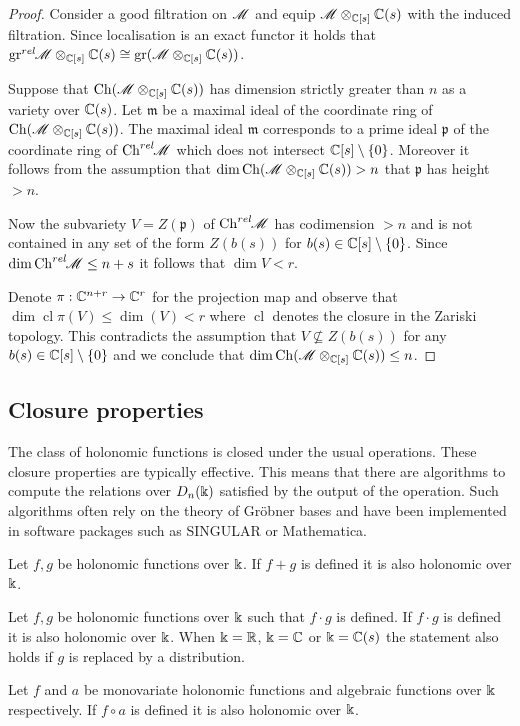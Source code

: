   \begin{proof}
    Consider a good filtration on $\mathscr{M}$ and equip $\mathscr{M}\otimes_{\mathbb{C}[s]}\mathbb{C}(s)$ with the induced filtration.
    Since localisation is an exact functor it holds that $\operatorname{gr}^{rel}\mkern-5mu\mathscr{M}\otimes_{\mathbb{C}[s]}\mathbb{C}(s) \cong \operatorname{gr}(\mathscr{M}\otimes_{\mathbb{C}[s]}\mathbb{C}(s)) $.

    Suppose that $\operatorname{Ch}(\mathscr{M}\otimes_{\mathbb{C}[s]}\mathbb{C}(s))$ has dimension strictly greater than $n$ as a variety over $\mathbb{C}(s)$.
    Let $\mathfrak{m}$ be a maximal ideal of the coordinate ring of $\operatorname{Ch} (\mathscr{M}\otimes_{\mathbb{C}[s]}\mathbb{C}(s))$.
    The maximal ideal $\mathfrak{m}$ corresponds to a prime ideal $\mathfrak{p}$ of the coordinate ring of $\operatorname{Ch}^{rel}\mkern-5mu\mathscr{M}$ which does not intersect $\mathbb{C}[s]\setminus\{0\}$.
    Moreover it follows from the assumption that  $\dim\operatorname{Ch}(\mathscr{M}\otimes_{\mathbb{C}[s]}\mathbb{C}(s))> n$ that $\mathfrak{p}$ has height $>n$.

    Now the subvariety $V = Z(\mathfrak{p})$ of $\operatorname{Ch}^{rel}\mkern-5mu\mathscr{M}$ has codimension $>n$ and is not contained in any set of the form $Z(b(s))$ for $b(s)\in \mathbb{C}[s]\setminus\{0\}$.
    Since $\dim\operatorname{Ch}^{rel}\mkern-5mu\mathscr{M}\leq n+s$ it follows that $\dim V <r$.

    Denote $\pi:\mathbb{C}^{n+r}\to\mathbb{C}^r $ for the projection map and observe that $\dim\operatorname{cl}\pi(V)\leq \dim(V) < r$ where $\operatorname{cl}$ denotes the closure in the Zariski topology. %
    This contradicts the assumption that $V\nsubseteq Z(b(s))$ for any $b(s)\in \mathbb{C}[s]\setminus\{0\}$ and we conclude that $\dim \operatorname{Ch} (\mathscr{M}\otimes_{\mathbb{C}[s]}\mathbb{C}(s)) \leq n$.
    \end{proof}
    \subsection{Closure properties}
    The class of holonomic functions is closed under the usual operations.
    These closure properties are typically effective.
    This means that there are algorithms to compute the relations over $D_n(\Bbbk)$ satisfied by the output of the operation.
    Such algorithms often rely on the theory of Gr\"obner bases and have been implemented in software packages such as SINGULAR or Mathematica.
    \begin{theorem}{\cite[Proposition 3.1]{zeilberger1990holonomic}}
      Let $f,g$ be holonomic functions over $\Bbbk$.
      If $f+g$ is defined it is also holonomic over $\Bbbk$.
    \end{theorem}
    \begin{theorem}{\cite[Proposition 3.2]{zeilberger1990holonomic}}
      Let $f,g$ be holonomic functions over $\Bbbk$ such that $f\cdot g$ is defined.
      If $f\cdot g$ is defined it is also holonomic over $\Bbbk$.
      When $\Bbbk=\mathbb{R}$, $\Bbbk = \mathbb{C}$ or $\Bbbk = \mathbb{C}(s)$ the statement also holds if $g$ is replaced by a distribution.
    \end{theorem}
    \begin{theorem}{\cite[Theorem 2.7]{stanley1980differentiably}}
      Let $f$ and $a$ be monovariate holonomic functions and algebraic functions over $\Bbbk$ respectively.
      If $f\circ a$ is defined it is also holonomic over $\Bbbk$.
    \end{theorem}
